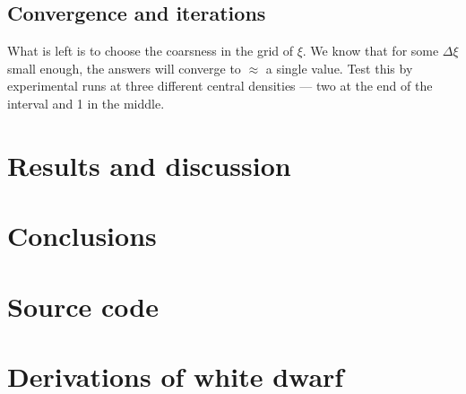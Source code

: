 \documentclass[]{article}
\begin{document}
\subsection{Convergence and iterations}
What is left is to choose the coarsness in the grid of $\xi$. We know that for some $\Delta \xi$ small enough, the answers will converge to $\approx$ a single value. Test this by experimental runs at three different central densities --- two at the end of the interval and 1 in the middle. 

\section{Results and discussion}


\section{Conclusions}
\appendix
\section{Source code}
\section{Derivations of white dwarf}
\end{document}
